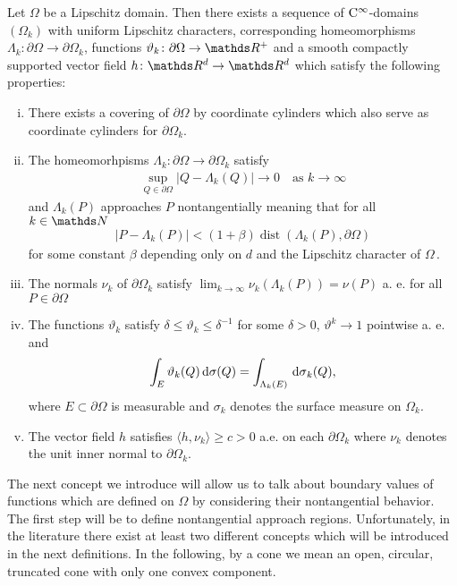 \begin{thm}[Ne\v{c}as, Verchota]
  \label{thm:smoothApproximation}
  Let $\Omega$ be a Lipschitz domain.
  Then there exists a sequence of $\mathrm{C}^\infty$-domains $(\Omega_k)$ with uniform Lipschitz characters, corresponding homeomorphisms $\Lambda_k \colon \partial\Omega \to \partial\Omega_k$, functions $\vartheta_k \colon \partial\Omega \to \R^+$ and a smooth compactly supported vector field $h \colon \R^d \to \R^d$ which satisfy the following properties:
  \begin{enumerate}[i)]
    \item There exists a covering of $\partial\Omega$ by coordinate cylinders which also serve as coordinate cylinders for $\partial\Omega_k$.
    \item The homeomorhpisms $\Lambda_k \colon \partial \Omega \to \partial\Omega_k$ satisfy
      \begin{align*}
        \sup_{Q \in \partial\Omega} |Q - \Lambda_k(Q)| \to 0\quad\text{as } k \to \infty
      \end{align*}
      and $\Lambda_k(P)$ approaches $P$ nontangentially meaning that for all $k \in \N$
      \begin{align*}
        | P - \Lambda_k(P) | < (1 + \beta) \operatorname{dist}(\Lambda_k(P), \partial\Omega)
      \end{align*}
      for some constant $\beta$ depending only on $d$ and the Lipschitz character of $\Omega\,$.
    \item The normals $\nu_k$ of $\partial\Omega_k$ satisfy $\lim_{k \to \infty} \nu_k(\Lambda_k(P)) = \nu(P)$ a. e. for all $P \in \partial\Omega$
    \item The functions $\vartheta_k$ satisfy $\delta \leq \vartheta_k \leq \delta^{-1}$ for some $\delta > 0$, $\vartheta^k \to 1$ pointwise a. e. and
      \begin{align*}
        \int_E \vartheta_k(Q) \, {\operatorname{d}\!{\sigma}}(Q) = \int_{\Lambda_k(E)} \, {\operatorname{d}\!{\sigma}}_k(Q),
      \end{align*}
      where $E \subset \partial \Omega$ is measurable and $\sigma_k$ denotes the surface measure on $\Omega_k$.
    \item The vector field $h$ satisfies $\langle h, \nu_k \rangle \geq c > 0$ a.e. on each $\partial\Omega_k$ where $\nu_k$ denotes the unit inner normal to $\partial\Omega_k$.
  \end{enumerate}
\end{thm}

The next concept we introduce will allow us to talk about boundary values of functions which are defined on $\Omega$ by considering their nontangential behavior.
The first step will be to define nontangential approach regions.
Unfortunately, in the literature there exist at least two different concepts which will be introduced in the next definitions.
  In the following, by a cone we mean an open, circular, truncated cone with only one convex component.

